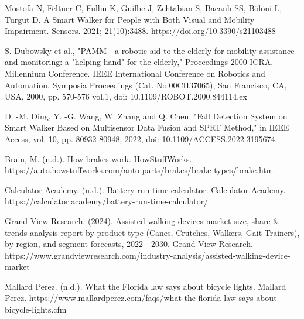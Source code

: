 \begin{thebibliography}{45}
	
	 Mostofa N, Feltner C, Fullin K, Guilbe J, Zehtabian S, Bacanlı SS, Bölöni L, Turgut D. A Smart Walker for People with Both Visual and Mobility Impairment. Sensors. 2021; 21(10):3488. https://doi.org/10.3390/s21103488
	
	 S. Dubowsky et al., "PAMM - a robotic aid to the elderly for mobility assistance and monitoring: a "helping-hand" for the elderly," Proceedings 2000 ICRA. Millennium Conference. IEEE International Conference on Robotics and Automation. Symposia Proceedings (Cat. No.00CH37065), San Francisco, CA, USA, 2000, pp. 570-576 vol.1, doi: 10.1109/ROBOT.2000.844114.ex
	
	 D. -M. Ding, Y. -G. Wang, W. Zhang and Q. Chen, "Fall Detection System on Smart Walker Based on Multisensor Data Fusion and SPRT Method," in IEEE Access, vol. 10, pp. 80932-80948, 2022, doi: 10.1109/ACCESS.2022.3195674.
	
	 Brain, M. (n.d.). How brakes work. HowStuffWorks. https://auto.howstuffworks.com/auto-parts/brakes/brake-types/brake.htm
	
	 Calculator Academy. (n.d.). Battery run time calculator. Calculator Academy. https://calculator.academy/battery-run-time-calculator/ 
	
	 Grand View Research. (2024). Assisted walking devices market size, share & trends analysis report by product type (Canes, Crutches, Walkers, Gait Trainers), by region, and segment forecasts, 2022 - 2030. Grand View Research. https://www.grandviewresearch.com/industry-analysis/assisted-walking-device-market
	
	 Mallard Perez. (n.d.). What the Florida law says about bicycle lights. Mallard Perez. https://www.mallardperez.com/faqs/what-the-florida-law-says-about-bicycle-lights.cfm 
	
\end{thebibliography}
